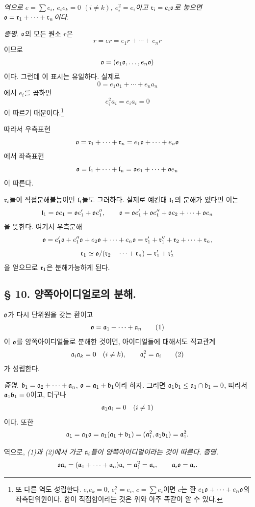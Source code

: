 \emph{역으로 \(e=\sum e_i\), \(e_i e_k=0\) \((i\ne k)\), \(e_i^2=e_i\)이고 \(\mathfrak r_i=e_i\mathfrak o\)로 놓으면 \(\mathfrak o=\mathfrak r_1+\cdots+\mathfrak r_n\)이다.}

\emph{증명.} \(\mathfrak o\)의 모든 원소 \(r\)은
\[
        r=er=e_1r+\cdots+e_nr
\]
이므로
\[
        \mathfrak o=(e_1\mathfrak o,\ldots,e_n\mathfrak o)
\]
이다. 그런데 이 표시는 유일하다. 실제로
\[
        0=e_1a_1+\cdots+e_na_n
\]
에서 \(e_i\)를 곱하면
\[
        e_i^2a_i=e_i a_i=0
\]
이 따르기 때문이다.\footnote{또 다른 역도 성립한다. \(e_i e_k=0\), \(e_i^2=e_i\), \(c=\sum e_i\)이면 \(c\)는 환 \(e_1\mathfrak o+\cdots+e_n\mathfrak o\)의 좌측단위원이다. 합이 직접합이라는 것은 위와 아주 똑같이 알 수 있다.}

따라서 우측표현
\[
        \mathfrak o=\mathfrak r_1+\cdots+\mathfrak r_n=e_1\mathfrak o+\cdots+e_n\mathfrak o
\]
에서 좌측표현
\[
        \mathfrak o=\mathfrak l_1+\cdots+\mathfrak l_n=\mathfrak o e_1+\cdots+\mathfrak o e_n
\]
이 따른다.

\(\mathfrak r_i\)들이 직접분해불능이면 \(\mathfrak l_i\)들도 그러하다. 실제로 예컨대 \(\mathfrak l_1\)의 분해가 있다면 이는
\[
        \mathfrak l_1=\mathfrak o e_1=\mathfrak o e_1'+\mathfrak o e_1'',
        \qquad
        \mathfrak o=\mathfrak o e_1'+\mathfrak o e_1''+\mathfrak o e_2+\cdots+\mathfrak o e_n
\]
을 뜻한다. 여기서 우측분해
\[
        \mathfrak o=e_1'\mathfrak o+e_1''\mathfrak o+e_2\mathfrak o+\cdots+e_n\mathfrak o
        =\mathfrak r_1'+\mathfrak r_1''+\mathfrak r_2+\cdots+\mathfrak r_n,
\]
\[
        \mathfrak r_1\simeq \mathfrak o/(\mathfrak r_2+\cdots+\mathfrak r_n)=\mathfrak r_1'+\mathfrak r_2'
\]
을 얻으므로 \(\mathfrak r_1\)은 분해가능하게 된다.

\subsection*{§ 10. 양쪽아이디얼로의 분해.}

\(\mathfrak o\)가 다시 단위원을 갖는 환이고
\begin{equation}
        \mathfrak o=\mathfrak{a}_1+\cdots+\mathfrak{a}_n                                  \tag{1}
\end{equation}
이 \(\mathfrak o\)를 양쪽아이디얼들로 분해한 것이면, 아이디얼들에 대해서도 직교관계
\begin{equation}
        \mathfrak{a}_i\mathfrak{a}_k=0\quad(i\ne k),
        \qquad
        \mathfrak{a}_i^2=\mathfrak{a}_i                                             \tag{2}
\end{equation}
가 성립한다.

\emph{증명.} \(\mathfrak{b}_1=\mathfrak{a}_2+\cdots+\mathfrak{a}_n\), \(\mathfrak o=\mathfrak{a}_1+\mathfrak{b}_1\)이라 하자. 그러면 \(\mathfrak{a}_1\mathfrak{b}_1\leq \mathfrak{a}_1\cap\mathfrak{b}_1=0\), 따라서 \(\mathfrak{a}_1\mathfrak{b}_1=0\)이고, 더구나
\[
        \mathfrak{a}_1\mathfrak{a}_i=0\quad(i\ne1)
\]
이다. 또한
\[
        \mathfrak{a}_1=\mathfrak{a}_1\mathfrak o=\mathfrak{a}_1(\mathfrak{a}_1+\mathfrak{b}_1)
        =(\mathfrak{a}_1^2,\mathfrak{a}_1\mathfrak{b}_1)=\mathfrak{a}_1^2.
\]

역으로, \emph{(1)과 (2)에서 가군 \(\mathfrak{a}_i\)들이 양쪽아이디얼이라는 것이 따른다.}
\emph{증명.}
\[
        \mathfrak o\mathfrak{a}_i=(\mathfrak{a}_1+\cdots+\mathfrak{a}_n)\mathfrak{a}_i=\mathfrak{a}_i^2=\mathfrak{a}_i,
        \qquad
        \mathfrak{a}_i\mathfrak o=\mathfrak{a}_i.
\]


